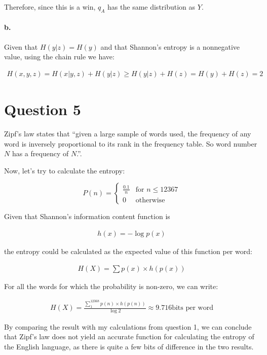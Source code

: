 \documentclass[fleqn]{article}
\begin{document}
Therefore, since this is a win, $q_A$ has the same distribution as $Y$.

\paragraph{b.}

Given that $H(y|z)=H(y)$ and that Shannon's entropy is a nonnegative value,
using the chain rule we have:

\begin{align*}
  H(x,y,z)=H(x|y,z) + H(y|z) \geq H(y|z) + H(z) = H(y) + H(z) = 2
\end{align*}

\section{Question 5}

Zipf's law states that ``given a large sample of words used, the
frequency of any word is inversely proportional to its rank in the frequency
table. So word number $N$ has a frequency of $N$.''.

Now, let's try to calculate the entropy:

\[
  P(n) = \left\{\begin{array}{lr}
      \frac{0.1}{n} & \text{for } n\leq 12367\\
      0 & \text{otherwise }
      \end{array}\right.
\]

Given that Shannon's information content function is

\begin{align*}
  h(x)=-\log{p(x)}
\end{align*}

the entropy could be calculated as the expected value of this function per word:

\begin{align*}
  H(X)=\sum{p(x)\times{}h(p(x))}
\end{align*}

For all the words for which the probability is non-zero, we can write:

\begin{align*}
  H(X)=\frac{\sum_1^{12368}p(n)\times{}h(p(n))}{\log{2}} \approx 9.716 \text{bits per word}
\end{align*}

By comparing the result with my calculations from question 1, we can conclude that
Zipf's law does not yield an accurate function for calculating the entropy of the English
language, as there is quite a few bits of difference in the two results.
\end{document}
